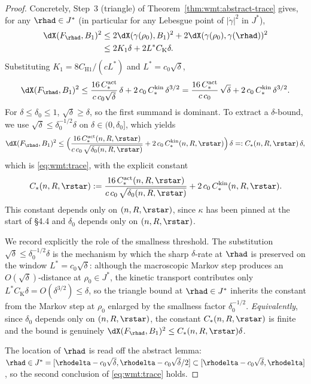 \begin{proof}
Concretely, Step~3 (triangle) of Theorem~\ref{thm:wmt:abstract-trace}
gives, for any $\rhad\in J^*$ (in particular for any Lebesgue point of
$|\dot\gamma|^2$ in $J^*$),
\begin{align*}
   \dX(F_\rhad,B_1)^2
   &\le 2\dX(\gamma(\rho_0),B_1)^2+2\dX(\gamma(\rho_0),\gamma(\rhad))^2\\
   &\le 2K_1\delta+2L^*C_{\mathrm K}\delta.
\end{align*}
Substituting $K_1=8C_{\mathrm H1}/(cL^*)$ and $L^*=c_0\sqrt{\delta}$,
\[
   \dX(F_\rhad,B_1)^2
   \le\frac{16\,C_*^{\mathrm{act}}}{c\,c_0\sqrt{\delta}}\,\delta
      +2\,c_0\,C_*^{\mathrm{kin}}\,\delta^{3/2}
   =\frac{16\,C_*^{\mathrm{act}}}{c\,c_0}\,\sqrt{\delta}
      +2\,c_0\,C_*^{\mathrm{kin}}\,\delta^{3/2}.
\]
For $\delta\le\delta_0\le 1$, $\sqrt{\delta}\ge\delta$, so the
first summand is dominant. To extract a $\delta$-bound, we use
$\sqrt{\delta}\le\delta_0^{-1/2}\delta$ on
$\delta\in(0,\delta_0]$, which yields
\begin{equation}\label{eq:wmt:trace-rate-recoded}
   \dX(F_\rhad,B_1)^2
   \le\Bigl(\frac{16\,C_*^{\mathrm{act}}(n,R,\rstar)}
                 {c\,c_0\,\sqrt{\delta_0(n,R,\rstar)}}
           +2\,c_0\,C_*^{\mathrm{kin}}(n,R,\rstar)\Bigr)\,\delta
   =: C_*(n,R,\rstar)\,\delta,
\end{equation}
which is \eqref{eq:wmt:trace}, with the explicit constant
\begin{equation}\label{eq:wmt:Cstar}
   C_*(n,R,\rstar)
   :=\frac{16\,C_*^{\mathrm{act}}(n,R,\rstar)}
          {c\,c_0\,\sqrt{\delta_0(n,R,\rstar)}}
     +2\,c_0\,C_*^{\mathrm{kin}}(n,R,\rstar).
\end{equation}
This constant depends only on $(n,R,\rstar)$, since $\kappa$ has been
pinned at the start of \S4.4 and $\delta_0$ depends only on
$(n,R,\rstar)$.

We record explicitly the role of the smallness threshold. The
substitution $\sqrt{\delta}\le\delta_0^{-1/2}\delta$ is the
mechanism by which the sharp $\delta$-rate at $\rhad$ is preserved on
the window $L^*=c_0\sqrt{\delta}$: although the macroscopic Markov
step produces an $O(\sqrt{\delta})$-distance at $\rho_0\in J^*$, the
kinetic transport contributes only $L^*C_{\mathrm K}\delta
=O(\delta^{3/2})\le\delta$, so the triangle bound at
$\rhad\in J^*$ inherits the constant from the Markov step at
$\rho_0$ enlarged by the smallness factor $\delta_0^{-1/2}$.
\emph{Equivalently}, since $\delta_0$ depends only on $(n,R,\rstar)$,
the constant $C_*(n,R,\rstar)$ is finite and the bound is genuinely
$\dX(F_\rhad,B_1)^2\le C_*(n,R,\rstar)\delta$.

The location of $\rhad$ is read off the abstract lemma:
$\rhad\in J^*=[\rhodelta-c_0\sqrt{\delta},\rhodelta-c_0\sqrt{\delta}/2]
\subset[\rhodelta-c_0\sqrt{\delta},\rhodelta]$, so the second
conclusion of \eqref{eq:wmt:trace} holds.
\end{proof}

